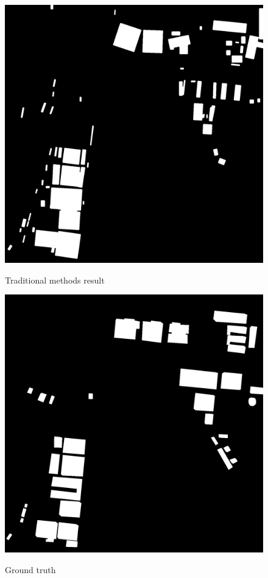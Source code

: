 \documentclass[]{IEEEtran}
\begin{document}
\newpage
\begin{figure}[!hbt]
		\vspace{0.7cm}
		\begin{center}
			\includegraphics[width=0.7\columnwidth]{fw}
			\caption{Traditional methods result}
			\label{fig:fw}
		    \vspace{0.2cm}
			\includegraphics[width=0.7\columnwidth]{rs}
			\caption{Ground truth}
			\label{fig:rt}
		\end{center}
	\end{figure}
\end{document}
